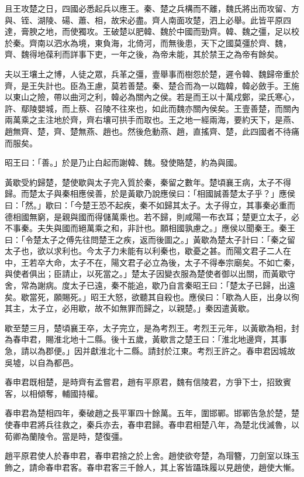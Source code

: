 \begin{pinyinscope}
且王攻楚之日，四國必悉起兵以應王。秦、楚之兵構而不離，魏氏將出而攻留、方與、铚、湖陵、碭、蕭、相，故宋必盡。齊人南面攻楚，泗上必舉。此皆平原四達，膏腴之地，而使獨攻。王破楚以肥韓、魏於中國而勁齊。韓、魏之彊，足以校於秦。齊南以泗水為境，東負海，北倚河，而無後患，天下之國莫彊於齊、魏，齊、魏得地葆利而詳事下吏，一年之後，為帝未能，其於禁王之為帝有餘矣。

夫以王壤土之博，人徒之眾，兵革之彊，壹舉事而樹怨於楚，遲令韓、魏歸帝重於齊，是王失計也。臣為王慮，莫若善楚。秦、楚合而為一以臨韓，韓必斂手。王施以東山之險，帶以曲河之利，韓必為關內之侯。若是而王以十萬戍鄭，梁氏寒心，許、鄢陵嬰城，而上蔡、召陵不往來也，如此而魏亦關內侯矣。王壹善楚，而關內兩萬乘之主注地於齊，齊右壤可拱手而取也。王之地一經兩海，要約天下，是燕、趙無齊、楚，齊、楚無燕、趙也。然後危動燕、趙，直搖齊、楚，此四國者不待痛而服矣。

昭王曰：「善。」於是乃止白起而謝韓、魏。發使賂楚，約為與國。

黃歇受約歸楚，楚使歇與太子完入質於秦，秦留之數年。楚頃襄王病，太子不得歸。而楚太子與秦相應侯善，於是黃歇乃說應侯曰：「相國誠善楚太子乎？」應侯曰：「然。」歇曰：「今楚王恐不起疾，秦不如歸其太子。太子得立，其事秦必重而德相國無窮，是親與國而得儲萬乘也。若不歸，則咸陽一布衣耳；楚更立太子，必不事秦。夫失與國而絕萬乘之和，非計也。願相國孰慮之。」應侯以聞秦王。秦王曰：「令楚太子之傅先往問楚王之疾，返而後圖之。」黃歇為楚太子計曰：「秦之留太子也，欲以求利也。今太子力未能有以利秦也，歇憂之甚。而陽文君子二人在中，王若卒大命，太子不在，陽文君子必立為後，太子不得奉宗廟矣。不如亡秦，與使者俱出；臣請止，以死當之。」楚太子因變衣服為楚使者御以出關，而黃歇守舍，常為謝病。度太子已遠，秦不能追，歇乃自言秦昭王曰：「楚太子已歸，出遠矣。歇當死，願賜死。」昭王大怒，欲聽其自殺也。應侯曰：「歇為人臣，出身以徇其主，太子立，必用歇，故不如無罪而歸之，以親楚。」秦因遣黃歇。

歇至楚三月，楚頃襄王卒，太子完立，是為考烈王。考烈王元年，以黃歇為相，封為春申君，賜淮北地十二縣。後十五歲，黃歇言之楚王曰：「淮北地邊齊，其事急，請以為郡便。」因并獻淮北十二縣。請封於江東。考烈王許之。春申君因城故吳墟，以自為都邑。

春申君既相楚，是時齊有孟嘗君，趙有平原君，魏有信陵君，方爭下士，招致賓客，以相傾奪，輔國持權。

春申君為楚相四年，秦破趙之長平軍四十餘萬。五年，圍邯鄲。邯鄲告急於楚，楚使春申君將兵往救之，秦兵亦去，春申君歸。春申君相楚八年，為楚北伐滅魯，以荀卿為蘭陵令。當是時，楚復彊。

趙平原君使人於春申君，春申君捨之於上舍。趙使欲夸楚，為瑁簪，刀劍室以珠玉飾之，請命春申君客。春申君客三千餘人，其上客皆躡珠履以見趙使，趙使大慚。


\end{pinyinscope}
